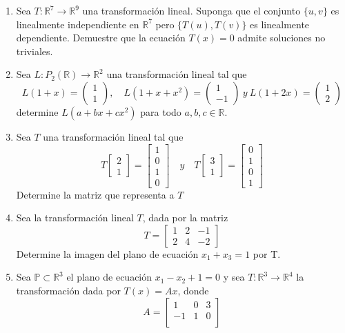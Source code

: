 \documentclass[12pt]{article}
\newenvironment{preguntas}
{\begin{enumerate}\itemsep12pt
	}
	{
	\end{enumerate}
}
\newcommand{\ra}{\rightarrow}
\newcommand{\R}{\mathbb{R}}
\begin{document}
\begin{preguntas}
\item Sea $T: \R^7 \ra \R^9$ una transformación lineal. Suponga que el conjunto $\{u,v\}$ es linealmente independiente en $\R^7$ pero $\{T(u), T(v)\}$ es linealmente dependiente. Demuestre que la ecuación $T(x)=0$ admite soluciones no triviales.
\item Sea $L: P_2(\R) \ra \R^2$ una transformación lineal tal que
	$$L(1+x) = \begin{pmatrix}
	1\\
	1
	\end{pmatrix}, \quad L(1+x+x^2) = \begin{pmatrix}
	1\\
	-1
	\end{pmatrix}\ y \ L(1+2x) = \begin{pmatrix}
	1\\
	2
	\end{pmatrix}$$
	determine $L(a+bx+cx^2)$ para todo $a,b,c \in \R$.
\item Sea $T$ una transformación lineal tal que
	$$T\begin{bmatrix}2 \\ 1\end{bmatrix} = \begin{bmatrix}1 \\ 0 \\ 1 \\ 0\end{bmatrix} 
	\quad y \quad
	T \begin{bmatrix}3 \\ 1\end{bmatrix}  =\begin{bmatrix}0 \\ 1 \\ 0 \\ 1\end{bmatrix}$$
	Determine la matriz que representa a $T$
\item Sea la transformación lineal $T$, dada por la matriz
	$$T = \begin{bmatrix}
	1 & 2 & -1\\
	2 & 4 & -2
	\end{bmatrix}$$
	Determine la imagen del plano de ecuación $x_1 + x_3 = 1$ por T.
\item Sea $\mathbb{P} \subset \R^3$ el plano de ecuación $x_1-x_2+1=0$ y sea $T:\R^3 \ra \R^4$ la transformación dada por $T(x) = Ax$, donde
$$A = \begin{bmatrix}
1 & 0 & 3\\
-1 & 1 & 0 \\

\end{bmatrix}$$
\end{preguntas}
\end{document}
